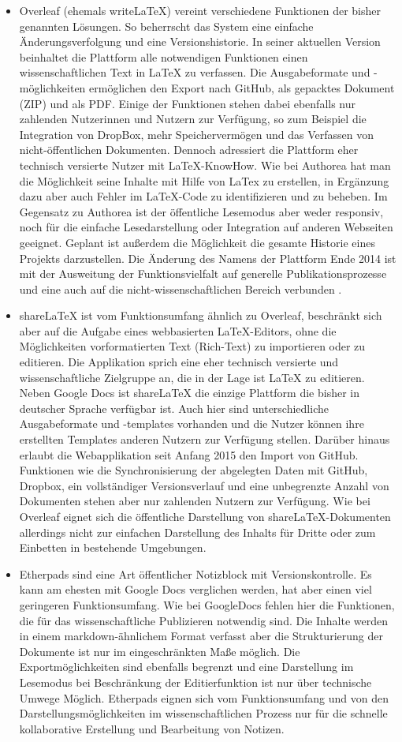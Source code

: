\begin{itemize}
\item Overleaf (ehemals writeLaTeX) vereint verschiedene Funktionen der bisher genannten Lösungen. So beherrscht das System eine einfache Änderungsverfolgung und eine Versionshistorie. In seiner aktuellen Version beinhaltet die Plattform alle notwendigen Funktionen einen wissenschaftlichen Text in LaTeX zu verfassen. Die Ausgabeformate und -möglichkeiten ermöglichen den Export nach GitHub, als gepacktes Dokument (ZIP) und als PDF. Einige der Funktionen stehen dabei ebenfalls nur zahlenden Nutzerinnen und Nutzern zur Verfügung, so zum Beispiel die Integration von DropBox, mehr Speichervermögen und das Verfassen von nicht-öffentlichen Dokumenten. Dennoch adressiert die Plattform eher technisch versierte Nutzer mit LaTeX-KnowHow. Wie bei Authorea hat man die Möglichkeit seine Inhalte mit Hilfe von LaTex zu erstellen, in Ergänzung dazu aber auch Fehler im LaTeX-Code zu identifizieren und zu beheben. Im Gegensatz zu Authorea ist der öffentliche Lesemodus aber weder responsiv, noch für die einfache Lesedarstellung oder Integration auf anderen Webseiten geeignet. Geplant ist außerdem die Möglichkeit die gesamte Historie eines Projekts darzustellen. Die Änderung des Namens der Plattform Ende 2014 ist mit der Ausweitung der Funktionsvielfalt auf generelle Publikationsprozesse und eine auch auf die nicht-wissenschaftlichen Bereich verbunden \cite{overleaf_2014}.
\item shareLaTeX ist vom Funktionsumfang ähnlich zu Overleaf, beschränkt sich aber auf die Aufgabe eines webbasierten LaTeX-Editors, ohne die Möglichkeiten vorformatierten Text (Rich-Text) zu importieren oder zu editieren. Die Applikation sprich eine eher technisch versierte und wissenschaftliche Zielgruppe an, die in der Lage ist LaTeX zu editieren. Neben Google Docs ist shareLaTeX die einzige Plattform die bisher in deutscher Sprache verfügbar ist. Auch hier sind unterschiedliche Ausgabeformate und -templates vorhanden und die Nutzer können ihre erstellten Templates anderen Nutzern zur Verfügung stellen. Darüber hinaus erlaubt die Webapplikation seit Anfang 2015 den Import von GitHub. Funktionen wie die Synchronisierung der abgelegten Daten mit GitHub, Dropbox, ein vollständiger Versionsverlauf und eine unbegrenzte Anzahl von Dokumenten stehen aber nur zahlenden Nutzern zur Verfügung. Wie bei Overleaf eignet sich die öffentliche Darstellung von shareLaTeX-Dokumenten allerdings nicht zur einfachen Darstellung des Inhalts für Dritte oder zum Einbetten in bestehende Umgebungen.
\item Etherpads sind eine Art öffentlicher Notizblock mit Versionskontrolle. Es kann am ehesten mit Google Docs verglichen werden, hat aber einen viel geringeren Funktionsumfang. Wie bei GoogleDocs fehlen hier die Funktionen, die für das wissenschaftliche Publizieren notwendig sind. Die Inhalte werden in einem markdown-ähnlichem Format verfasst aber die Strukturierung der Dokumente ist nur im eingeschränkten Maße möglich. Die Exportmöglichkeiten sind ebenfalls begrenzt und eine Darstellung im Lesemodus bei Beschränkung der Editierfunktion ist nur über technische Umwege Möglich. Etherpads eignen sich vom Funktionsumfang und von den Darstellungsmöglichkeiten im wissenschaftlichen Prozess nur für die schnelle kollaborative Erstellung und Bearbeitung von Notizen.

\end{itemize}
